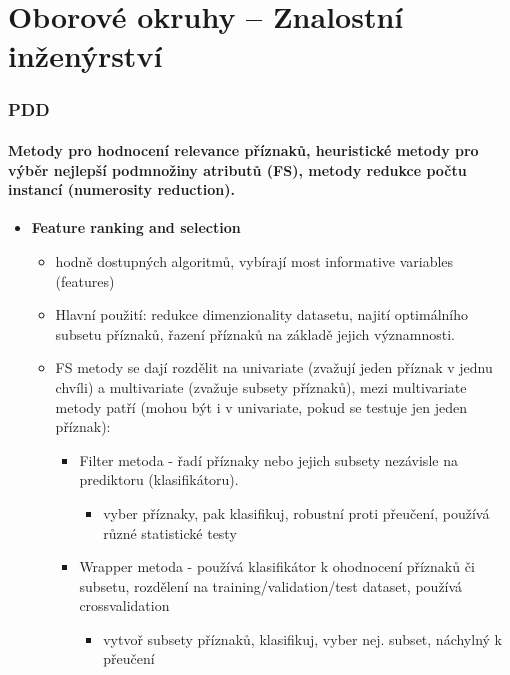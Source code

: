 \documentclass[a4paper,hidelinks]{article}
\begin{document}
\newpage
\part{Oborové okruhy -- Znalostní inženýrství}

\section{PDD}

\subsection{Metody pro hodnocení relevance příznaků, heuristické metody pro výběr nejlepší podmnožiny atributů (FS), metody redukce počtu instancí (numerosity reduction).}

\begin{itemize}
    \item \textbf{Feature ranking and selection}
        \begin{itemize}
            \item hodně dostupných algoritmů, vybírají most informative variables (features)
            \item Hlavní použití: redukce dimenzionality datasetu, najití optimálního subsetu příznaků, řazení příznaků na základě jejich významnosti.
            \item FS metody se dají rozdělit na univariate (zvažují jeden příznak v jednu chvíli) a multivariate (zvažuje subsety příznaků), mezi multivariate metody patří (mohou být i v univariate, pokud se testuje jen jeden příznak):
                \begin{itemize}
                    \item Filter metoda - řadí příznaky nebo jejich subsety nezávisle na prediktoru (klasifikátoru).
                        \begin{itemize}
                            \item vyber příznaky, pak klasifikuj, robustní proti přeučení, používá různé statistické testy
                        \end{itemize}
                    \item Wrapper metoda - používá klasifikátor k ohodnocení příznaků či subsetu, rozdělení na training/validation/test dataset, používá crossvalidation
                        \begin{itemize}
                            \item vytvoř subsety příznaků, klasifikuj, vyber nej. subset, náchylný k přeučení

\end{itemize}
\end{itemize}
\end{itemize}
\end{itemize}
\end{document}
